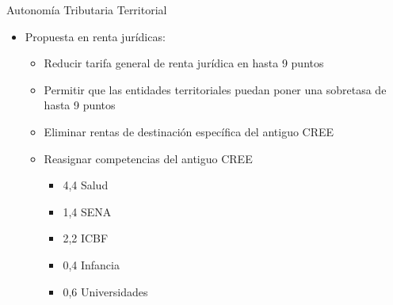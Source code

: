 \begin{frame}{Autonomía Tributaria Territorial}
\begin{itemize}
  \item Propuesta en renta jurídicas:
  \begin{itemize}
    \item Reducir tarifa general de renta jurídica en hasta 9 puntos 
    \item Permitir que las entidades territoriales puedan poner una sobretasa de hasta 9 puntos 
    \item Eliminar rentas de destinación específica del antiguo CREE
    \item Reasignar competencias del antiguo CREE 
    \begin{itemize}
        \item 4,4 Salud
        \item 1,4 SENA
        \item 2,2 ICBF 
        \item 0,4 Infancia
        \item 0,6 Universidades
    \end{itemize}
  \end{itemize}
\end{itemize}
\end{frame}

